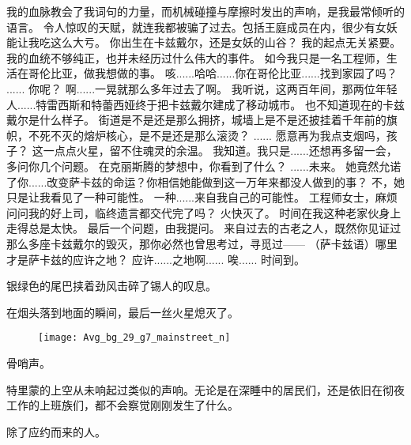 \documentclass[openany]{book}
\begin{document}
\begin{dialogue}
     我的血脉教会了我词句的力量，而机械碰撞与摩擦时发出的声响，是我最常倾听的语言。
     令人惊叹的天赋，就连我都被骗了过去。包括王庭成员在内，很少有女妖能让我吃这么大亏。
     你出生在卡兹戴尔，还是女妖的山谷？
     我的起点无关紧要。我的血统不够纯正，也并未经历过什么伟大的事件。
     如今我只是一名工程师，生活在哥伦比亚，做我想做的事。
     咳......哈哈......你在哥伦比亚......找到家园了吗？
     ......
     你呢？
     啊......一晃就那么多年过去了啊。
     我听说，这两百年间，那两位年轻人......特雷西斯和特蕾西娅终于把卡兹戴尔建成了移动城市。
     也不知道现在的卡兹戴尔是什么样子。
     街道是不是还是那么拥挤，城墙上是不是还披挂着千年前的旗帜，不死不灭的熔炉核心，是不是还是那么滚烫？
     ......
     愿意再为我点支烟吗，孩子？
     这一点点火星，留不住魂灵的余温。
     我知道。我只是......还想再多留一会，多问你几个问题。
     在克丽斯腾的梦想中，你看到了什么？
     ......未来。
     她竟然允诺了你......改变萨卡兹的命运？你相信她能做到这一万年来都没人做到的事？
     不，她只是让我看见了一种可能性。
     一种......来自我自己的可能性。
     工程师女士，麻烦问问我的好上司，临终遗言都交代完了吗？
     火快灭了。
     时间在我这种老家伙身上走得总是太快。
     最后一个问题，由我提问。
     来自过去的古老之人，既然你见证过那么多座卡兹戴尔的毁灭，那你必然也曾思考过，寻觅过——
     （萨卡兹语）哪里才是萨卡兹的应许之地？
     应许......之地啊......
     唉......
     时间到。
\end{dialogue}\par

银绿色的尾巴挟着劲风击碎了锡人的叹息。\par
在烟头落到地面的瞬间，最后一丝火星熄灭了。\par

\begin{figure}[h]
    \centering
    \texttt{[image: Avg\_bg\_29\_g7\_mainstreet\_n]}
\end{figure}

骨哨声。\par
特里蒙的上空从未响起过类似的声响。无论是在深睡中的居民们，还是依旧在彻夜工作的上班族们，都不会察觉刚刚发生了什么。\par
除了应约而来的人。
\end{document}
